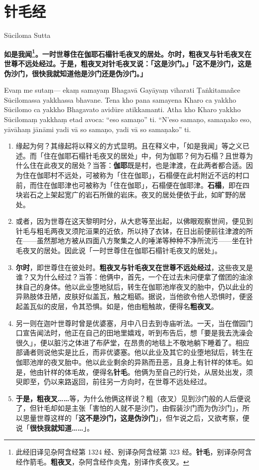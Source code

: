 \section{针毛经}

\begin{center}Sūciloma Sutta\end{center}\vspace{1em}

\textbf{如是我闻\footnote{此经旧译见杂阿含经第 1324 经、别译杂阿含经第 323 经。\textbf{针毛}，别译杂阿含经作箭毛。\textbf{粗夜叉}，杂阿含经作炎鬼，别译作炙夜叉。}。一时世尊住在伽耶石榻针毛夜叉的居处。尔时，粗夜叉与针毛夜叉在世尊不远处经过。于是，粗夜叉对针毛夜叉说：「这是沙门。」「这不是沙门，这是伪沙门，很快我就知道他是沙门还是伪沙门。」}

Evaṃ me sutaṃ— ekaṃ samayaṃ Bhagavā Gayāyaṃ viharati Ṭaṅkitamañce Sūcilomassa yakkhassa bhavane. Tena kho pana samayena Kharo ca yakkho Sūcilomo ca yakkho Bhagavato avidūre atikkamanti. Atha kho Kharo yakkho Sūcilomaṃ yakkhaṃ etad avoca: “eso samaṇo” ti. “N’eso samaṇo, samaṇako eso, yāvāhaṃ jānāmi yadi vā so samaṇo, yadi vā so samaṇako” ti.

\begin{enumerate}\item 缘起为何？其缘起将以释义的方式显明。且在释义中，「如是我闻」等之义已述。而「住在伽耶石榻针毛夜叉的居处」中，何为伽耶？何为石榻？且世尊为什么住在此夜叉的居处？当答：\textbf{伽耶}既是村，也是津渡，在此两者都合适。因为住在伽耶村不远处，可被称为「住在伽耶」，石榻便在此村附近不远的村口前，而住在伽耶津也可被称为「住在伽耶」，石榻便在伽耶津。\textbf{石榻}，即在四块岩石之上架起宽广的岩石所做的岩床。夜叉的居处便依于此，如旷野的居处。
\item 或者，因为世尊在这天黎明时分，从大悲等至出起，以佛眼观察世间，便见到针毛与粗毛两夜叉须陀洹果的近依，所以持了衣钵，在日出前便前往津渡的所在——虽然那地方被从四面八方聚集之人的唾涕等种种不净所流污——坐在针毛夜叉的居处。因此说「一时世尊住在伽耶石榻针毛夜叉的居处」。
\item \textbf{尔时}，即世尊住在彼处时。\textbf{粗夜叉与针毛夜叉在世尊不远处经过}，这些夜叉是谁？又为什么经过？当答：他俩中，首先，一个在过去未问便拿了僧团的油涂抹自己的身体。他以此业堕地狱后，转生在伽耶池岸夜叉的胎中，仍以此业的异熟肢体丑陋，皮肤好似盖瓦，触之粗砺。据说，当他欲令他人恐惧时，便竖起盖瓦似的皮层，令其恐惧。如是，他由粗触故，便得名\textbf{粗夜叉}。
\item 另一则在迦叶世尊时曾是优婆塞，月中八日去到寺庙听法。一天，当在僧园门口宣告闻法时，他正在自己的田地里嬉戏，听到布告后，想「要是我去洗澡会很久」，便以脏污之体进了布萨堂，在昂贵的地毯上不敬地躺下睡着了。相应部诵者则说他实是比丘，而非优婆塞。他以此业及其它的业堕地狱后，转生在伽耶池岸的夜叉胎中。他以此业剩余的异熟而丑恶，且身上有针样的体毛。如是，他由针样的体毛故，便得名\textbf{针毛}。他俩为至自己的行处，从居处出发，须臾即至，仍以来路返回，前往另一方向时，在世尊不远处经过。
\item \textbf{于是，粗夜叉……}等，为什么他俩这样说？粗（夜叉）见到沙门般的人后便说了，但针毛却如是主张「害怕的人就不是沙门，由假装沙门而为伪沙门」，所以思量世尊这样的「\textbf{这不是沙门，这是伪沙门}」，但乍说之后，又欲考察，便说「\textbf{很快我就知道……}」。\end{enumerate}

